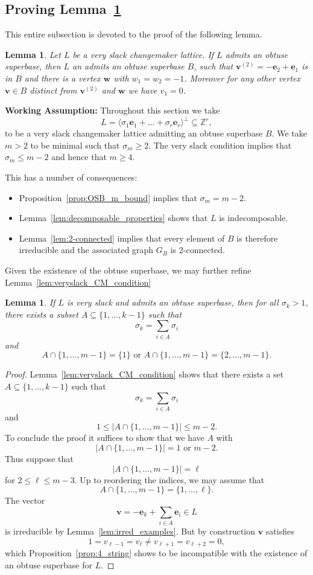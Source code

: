 \documentclass{amsart} %
\newcommand{\Z}{\mathbb{Z}}
\newcommand{\e}{\bm{e}}
\newcommand{\bv}{\bm{v}}
\theoremstyle{thm}
\newtheorem{lem}[Theorem]{Lemma}
\theoremstyle{definition}
\numberwithin{equation}{section}
\begin{document}
\subsection{Proving Lemma~\ref{lem:modified_basis}}
This entire subsection is devoted to the proof of the following lemma.
\begin{lem}\label{lem:modified_basis}
Let $L$ be a very slack changemaker lattice. If $L$ admits an obtuse superbase, then $L$ an admits an obtuse superbase $B$, such that $\bv^{(2)}=-\e_2 +\e_1$ is in $B$ and there is a vertex $\bm{w}$ with $w_1=w_2=-1$. Moreover for any other vertex $\bv\in B$ distinct from $\bv^{(2)}$ and $\bm{w}$ we have $v_1=0$.
\end{lem}

\noindent
\textbf{Working Assumption:}  Throughout this section we take
\[
L=\langle \sigma_1 \e_1 + \dots + \sigma_r \e_r \rangle^\bot\subseteq \Z^r,
\]
to be a very slack changemaker lattice admitting an obtuse superbase $B$. We take $m> 2$ to be minimal such that $\sigma_m\geq 2$. The very slack condition implies that $\sigma_m \leq m-2$ and hence that $m\geq 4$.

This has a number of consequences:
\begin{itemize}
    \item Proposition~\ref{prop:OSB_m_bound} implies that $\sigma_m=m-2$.
    \item Lemma~\ref{lem:decomposable_properties} shows that $L$ is indecomposable.
    \item Lemma~\ref{lem:2-connected} implies that every element of $B$ is therefore irreducible and the associated graph $G_B$ is 2-connected.
\end{itemize}

Given the existence of the obtuse superbase, we may further refine Lemma~\ref{lem:veryslack_CM_condition}
\begin{lem}\label{lem:veryslack_condition}
If $L$ is very slack and admits an obtuse superbase, then for all $\sigma_k>1$, there exists a subset $A\subseteq\{1, \dots, k-1\}$ such that
\[
\sigma_k = \sum_{i\in A} \sigma_i
\]
and 
\[
\text{$A \cap \{1, \dots, m-1\}=\{1\}$ or $A \cap \{1, \dots, m-1\}=\{2, \dots, m-1\}$.}
\]
\end{lem}
\begin{proof}
Lemma~\ref{lem:veryslack_CM_condition} shows that there exists a set $A\subseteq\{1, \dots, k-1\}$ such that
\[
\sigma_k = \sum_{i\in A} \sigma_i
\]
and
\[1\leq |A \cap \{1, \dots, m-1\}|\leq m-2.\]
To conclude the proof it suffices to show that we have $A$ with 
\[
\text{$|A \cap \{1, \dots, m-1\}|=1$ or $m-2$}.
\]
Thus suppose that 
\[|A \cap \{1, \dots, m-1\}|=\ell\] for $2\leq \ell \leq m-3$. 
Up to reordering the indices, we may assume that
\[
A \cap \{1, \dots, m-1\}=\{1, \dots, \ell\}.
\]
The vector
\[
\bv=-\e_k +\sum_{i\in A} \e_i \in L
\]
is irreducible by Lemma~\ref{lem:irred_examples}. But by construction $\bv$ satisfies 
\[1=v_{\ell-1}=v_{\ell}\neq v_{\ell+1}=v_{\ell+2}=0,\] which Proposition~\ref{prop:4_string} shows to be incompatible with the existence of an obtuse superbase for $L$.
\end{proof}
\end{document}
